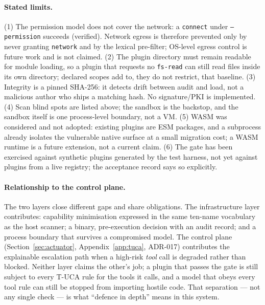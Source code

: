 \paragraph{Stated limits.}
(1) The permission model does not cover the network: a \texttt{connect} under
\texttt{--permission} succeeds (verified). Network egress is therefore
prevented only by never granting \texttt{network} and by the lexical
pre-filter; OS-level egress control is future work and is not claimed.
(2) The plugin directory must remain readable for module loading, so a plugin
that requests no \texttt{fs-read} can still read files inside its own
directory; declared scopes add to, they do not restrict, that baseline.
(3) Integrity is a pinned SHA-256: it detects drift between audit and load, not
a malicious author who ships a matching hash. No signature/PKI is implemented.
(4) Scan blind spots are listed above; the sandbox is the backstop, and the
sandbox itself is one process-level boundary, not a VM. (5) WASM was
considered and not adopted: existing plugins are ESM packages, and a
subprocess already isolates the vulnerable native surface at a small migration
cost; a WASM runtime is a future extension, not a current claim. (6) The gate
has been exercised against synthetic plugins generated by the test harness,
not yet against plugins from a live registry; the acceptance record says so
explicitly.

\paragraph{Relationship to the control plane.}
The two layers close different gaps and share obligations. The infrastructure
layer contributes: capability minimisation expressed in the same ten-name
vocabulary as the host scanner; a binary, pre-execution decision with an audit
record; and a process boundary that survives a compromised model. The control
plane (Section~\ref{sec:actuator}, Appendix~\ref{app:tuca}, ADR-017)
contributes the explainable escalation path when a high-risk \emph{tool} call
is degraded rather than blocked. Neither layer claims the other's job; a
plugin that passes the gate is still subject to every T-UCA rule for the tools
it calls, and a model that obeys every tool rule can still be stopped from
importing hostile code. That separation --- not any single check --- is what
``defence in depth'' means in this system.
